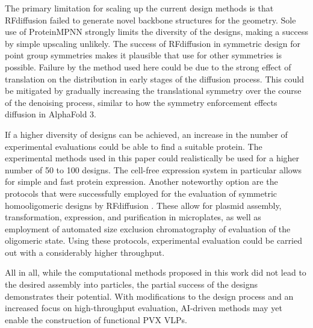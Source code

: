 The primary limitation for scaling up the current design methods is that RFdiffusion failed to generate novel backbone structures for the geometry. Sole use of ProteinMPNN strongly limits the diversity of the designs, making a success by simple upscaling unlikely. The success of RFdiffusion in symmetric design for point group symmetries makes it plausible that use for other symmetries is possible. Failure by the method used here could be due to the strong effect of translation on the distribution in early stages of the diffusion process. This could be mitigated by gradually increasing the translational symmetry over the course of the denoising process, similar to how the symmetry enforcement effects diffusion in AlphaFold 3.

If a higher diversity of designs can be achieved, an increase in the number of experimental evaluations could be able to find a suitable protein. The experimental methods used in this paper could realistically be used for a higher number of 50 to 100 designs. The cell-free expression system in particular allows for simple and fast protein expression. Another noteworthy option are the protocols that were successfully employed for the evaluation of symmetric homooligomeric designs by RFdiffusion \cite{RFdiffusion}. These allow for plasmid assembly, transformation, expression, and purification in microplates, as well as employment of automated size exclusion chromatography of evaluation of the oligomeric state. Using these protocols, experimental evaluation could be carried out with a considerably higher throughput. 

All in all, while the computational methods proposed in this work did not lead to the desired assembly into particles, the partial success of the designs demonstrates their potential. With modifications to the design process and an increased focus on high-throughput evaluation, AI-driven methods may yet enable the construction of functional PVX VLPs.